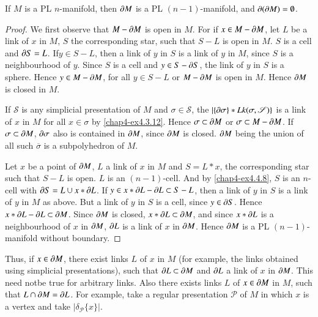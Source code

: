 \begin{proposition}\label{chap4-prop4.4.11}
If $M$ is a PL $n$-manifold, then $\partial M$ is a PL $(n-1)$-manifold, and $\partial(\partial M)=\emptyset$.
\end{proposition}

\begin{proof}
We first observe that $M-\partial M$ is open in $M$. For if $x\in M-\partial M$, let $L$ be a link of $x$ in $M$, $S$ the corresponding star, such that $S-L$ is open in $M$. $S$ is a cell and $\partial S=L$. If\pageoriginale $y\in S-L$, then a link of $y$ in $S$ is a link of $y$ in $M$, since $S$ is a neighbourhood of $y$. Since $S$ is a cell and $y\in S-\partial S$, the link of $y$ in $S$ is a sphere. Hence $y\in M-\partial M$, for all $y\in S-L$ or $M-\partial M$ is open in $M$. Hence $\partial M$ is closed in $M$. 

If $\mathscr{S}$ is any simplicial presentation of $M$ and $\sigma\in \mathscr{S}$, the $|\{\partial \sigma\}\ast Lk(\sigma,\mathscr{S})\}$ is a link of $x$ in $M$ for all $x\in \sigma$ by \ref{chap4-ex4.3.12}. Hence $\sigma\subset \partial M$ or $\sigma\subset M-\partial M$. If $\sigma\subset \partial M$, $\partial \sigma$ also is contained in $\partial M$, since $\partial M$ is closed. $\partial M$ being the union of all such $\overline{\sigma}$ is a subpolyhedron of $M$.

Let $x$ be a point of $\partial M$, $L$ a link of $x$ in $M$ and $S=L\ast x$, the corresponding star such that $S-L$ is open. $L$ is an $(n-1)$-cell. And by \ref{chap4-ex4.4.8}, $S$ is an $n$-cell with $\partial S=L\cup x\ast \partial L$. If $y\in x\ast \partial L-\partial L\subset S-L$, then a link of $y$ in $S$ is a link of $y$ in $M$ as above. But a link of $y$ in $S$ is a cell, since $y\in \partial S$. Hence $x\ast \partial L-\partial L\subset \partial M$. Since $\partial M$ is closed, $x\ast\partial L\subset \partial M$, and since $x\ast\partial L$ is a neighbourhood of $x$ in $\partial M$, $\partial L$ is a link of $x$ in $\partial M$. Hence $\partial M$ is a PL $(n-1)$-manifold without boundary.
\end{proof}

\begin{remark*}
Thus, if $x\in \partial M$, there exist links $L$ of $x$ in $M$ (for example, the links obtained using simplicial presentations), such that $\partial L\subset \partial M$ and $\partial L$ a link of $x$ in $\partial M$. This need notbe true for arbitrary links. Also there exists links $L$ of $x\in \partial M$ in $M$, such that $L\cap \partial M=\partial L$. For example, take a regular presentation $\mathscr{P}$ of $M$ in which $x$ is a vertex and take $|\delta_{\mathscr{P}}\{x\}|$.
\end{remark*}

